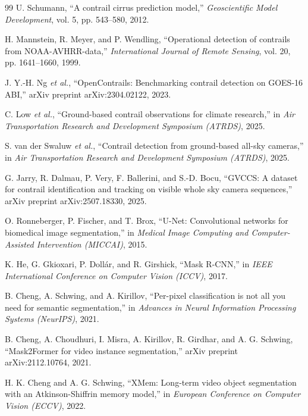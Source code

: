 \documentclass[1p,11pt]{elsarticle}
\begin{document}
\begin{thebibliography}{99}
U. Schumann, ``A contrail cirrus prediction model,'' \textit{Geoscientific Model Development}, vol. 5, pp. 543--580, 2012.

H. Mannstein, R. Meyer, and P. Wendling, ``Operational detection of contrails from NOAA-AVHRR-data,'' \textit{International Journal of Remote Sensing}, vol. 20, pp. 1641--1660, 1999.

J. Y.-H. Ng \textit{et al.}, ``OpenContrails: Benchmarking contrail detection on GOES-16 ABI,'' arXiv preprint arXiv:2304.02122, 2023.

C. Low \textit{et al.}, ``Ground-based contrail observations for climate research,'' in \textit{Air Transportation Research and Development Symposium (ATRDS)}, 2025.

S. van der Swaluw \textit{et al.}, ``Contrail detection from ground-based all-sky cameras,'' in \textit{Air Transportation Research and Development Symposium (ATRDS)}, 2025.

G. Jarry, R. Dalmau, P. Very, F. Ballerini, and S.-D. Bocu, ``GVCCS: A dataset for contrail identification and tracking on visible whole sky camera sequences,'' arXiv preprint arXiv:2507.18330, 2025.

O. Ronneberger, P. Fischer, and T. Brox, ``U-Net: Convolutional networks for biomedical image segmentation,'' in \textit{Medical Image Computing and Computer-Assisted Intervention (MICCAI)}, 2015.

K. He, G. Gkioxari, P. Doll\'{a}r, and R. Girshick, ``Mask R-CNN,'' in \textit{IEEE International Conference on Computer Vision (ICCV)}, 2017.

B. Cheng, A. Schwing, and A. Kirillov, ``Per-pixel classification is not all you need for semantic segmentation,'' in \textit{Advances in Neural Information Processing Systems (NeurIPS)}, 2021.

B. Cheng, A. Choudhuri, I. Misra, A. Kirillov, R. Girdhar, and A. G. Schwing, ``Mask2Former for video instance segmentation,'' arXiv preprint arXiv:2112.10764, 2021.

H. K. Cheng and A. G. Schwing, ``XMem: Long-term video object segmentation with an Atkinson-Shiffrin memory model,'' in \textit{European Conference on Computer Vision (ECCV)}, 2022.


\end{thebibliography}
\end{document}
